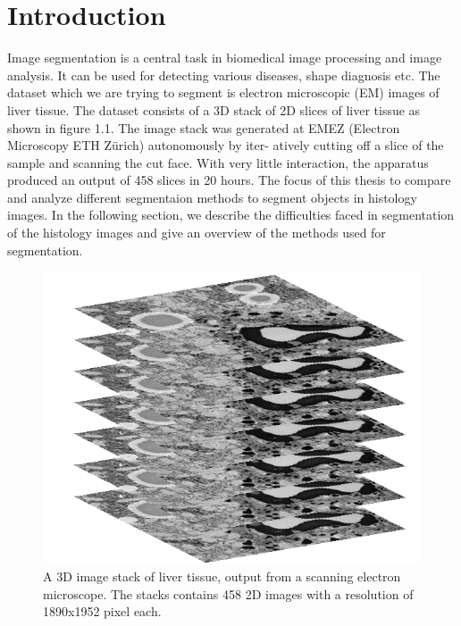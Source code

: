 %


\chapter{Introduction}
Image segmentation is a central task in biomedical image processing and image analysis. It can be used for detecting various diseases, shape diagnosis etc. The dataset which we are trying to segment is electron microscopic (EM) images of liver tissue. The dataset consists of a 3D stack of 2D slices of liver tissue as shown in figure 1.1. The image stack was generated at EMEZ (Electron Microscopy ETH Zürich) autonomously by iter-
atively cutting off a slice of the sample and scanning the cut face. With very little
interaction, the apparatus produced an output of 458 slices in 20 hours. The focus of this thesis to compare and analyze different segmentaion methods to segment objects in histology images. In the following section, we describe the difficulties faced in segmentation of the histology images and give an overview of the methods used for segmentation. 

\begin{figure}[h!] \label{fig:3dstack}
\centering
 \includegraphics[width=0.8\linewidth]{figures/3d_stack.png}
\caption{A 3D image stack of liver tissue, output from a scanning electron microscope.
The stacks contains 458 2D images with a resolution of 1890x1952 pixel each.}
\end{figure}



